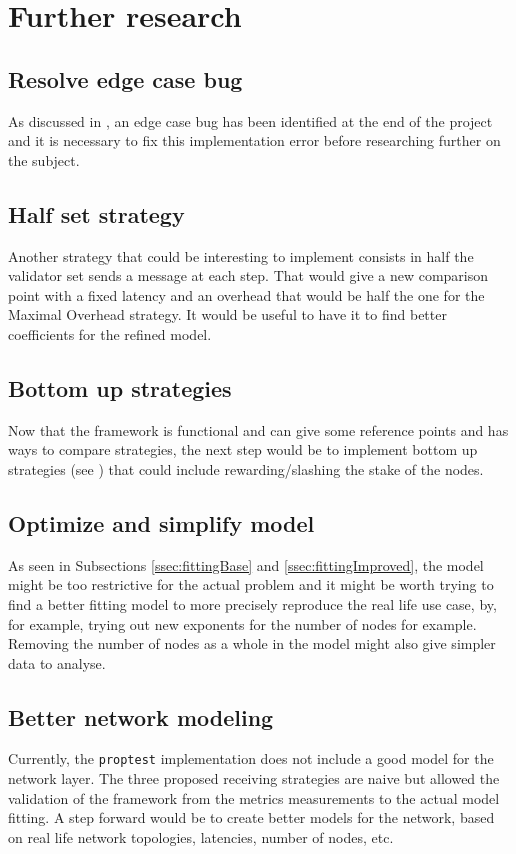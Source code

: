 \FloatBarrier
\section{Further research}
\subsection{Resolve edge case bug}
As discussed in , an edge case bug has been identified at
the end of the project and it is necessary to fix this implementation error
before researching further on the subject.

\subsection{Half set strategy}
Another strategy that could be interesting to implement consists in 
half the validator set sends a message at each step. That would give a new
comparison point with a fixed latency and an overhead that would be half the one
for the Maximal Overhead strategy. It would be useful to have it to find better
coefficients for the refined model.

\subsection{Bottom up strategies}
Now that the framework is functional and can give some reference points and has
ways to compare strategies, the next step would be to implement bottom
up strategies (see ) that could include
rewarding/slashing the stake of the nodes.

\subsection{Optimize and simplify model}
As seen in Subsections \ref{ssec:fittingBase} and \ref{ssec:fittingImproved},
the model might be too restrictive for the actual problem and it might be worth
trying to find a better fitting model to more precisely reproduce the real life
use case, by, for example, trying out new exponents for the number of nodes for
example. Removing the number of nodes as a whole in the model might also give
simpler data to analyse.

\subsection{Better network modeling}
Currently, the \texttt{proptest} implementation does not include a good model
for the network layer. The three proposed receiving strategies are naive but
allowed the validation of the framework from the metrics measurements to the actual
model fitting. A step forward would be to create better models for the
network, based on real life network topologies, latencies, number of nodes, etc.

